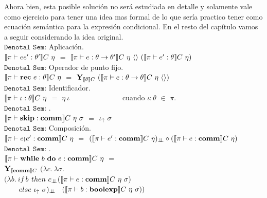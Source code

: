 Ahora bien, esta posible soluci\'on no ser\'a estudiada en detalle y solamente
vale como ejercicio para tener una idea mas formal de lo que ser\'ia practico
tener como ecuaci\'on sem\'antica para la expresi\'on condicional. En el resto 
del cap\'itulo vamos a seguir considerando la idea original.\\

\noindent
$\texttt{Denotal Sem:}$ Aplicaci\'on.\\

$\semBrcks{ \pi \vdash ee' : \theta' }C \ \eta$ 
$=$ 
$\llbracket  \pi \vdash e : \theta \rightarrow \theta'  \rrbracket C \ \eta \ \langle  \rangle \
(\llbracket  \pi \vdash e' : \theta  \rrbracket C \ \eta)$\\

\noindent
$\texttt{Denotal Sem:}$ Operador de punto fijo.\\

$\semBrcks{ \pi \vdash \rec e : \theta}C \ \eta$ 
$=$ 
$\Y_{\semBrcks{\theta}C} \ 
(\semBrcks{ \pi \vdash e : \theta \rightarrow \theta}C \ \eta \ \lrangles{})$\\

\noindent
$\texttt{Denotal Sem:}$ Identificador.\\

$\semBrcks{ \pi \vdash \iota : \theta }C \ \eta$ $=$ $\eta \ \iota$
\ \ \ \ \ \ \ \ \ \ \ \ \ \ cuando $\iota:\theta$ $\in$ $\pi$.\\

\noindent
$\texttt{Denotal Sem:}$ \cskip.\\

$\semBrcks{ \pi \vdash \cskip : \commt }C \ \eta \ \sigma$ $=$ $\iota_{\uparrow} \ \sigma$\\

\noindent
$\texttt{Denotal Sem:}$ Composici\'on.\\

$\llbracket  \pi \vdash e \textbf{;} e' : \textbf{comm}  \rrbracket C \ \eta$ 
$=$ 
$(\semBrcks{\pi \vdash e' : \commt}C \ \eta)_{\dbot}
\circ
(\semBrcks{ \pi \vdash e : \commt}C \ \eta)$\\

\noindent
$\texttt{Denotal Sem:}$ \cwhile.\\

$\llbracket  \pi \vdash \textbf{while} \ b \ \textbf{do} \ e : \textbf{comm}  \rrbracket C \ \eta$ 
$=$ \\
\indent \indent \indent
$\textbf{Y}_{\llbracket \textbf{comm} \rrbracket C}$ $(\lambda c . \ \lambda \sigma . \ $\\
\indent \indent \indent \indent \indent \indent
$(\lambda b . \ if \ b $ $then \ c_{\bot \!\!\! \bot} (\llbracket \pi \vdash e : \textbf{comm} \rrbracket C \ \eta \ \sigma)$\\
 \indent \indent  \indent \indent \indent \indent \indent \indent \ \ \ \
$else \ \iota_{\uparrow} \ \sigma)_{\bot \!\!\! \bot}$ \
$(\llbracket  \pi \vdash b : \textbf{boolexp} \rrbracket C \ \eta \ \sigma))$\\

